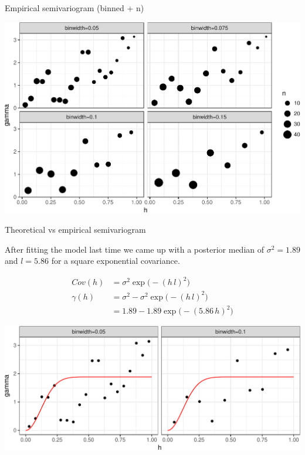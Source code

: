 \documentclass[11pt,ignorenonframetext,]{beamer}
\begin{document}
\begin{frame}{%
\protect\hypertarget{empirical-semivariogram-binned-n}{%
Empirical semivariogram (binned + n)}}

\begin{center}\includegraphics[width=\textwidth]{Lec13_files/figure-beamer/unnamed-chunk-7-1} \end{center}

\end{frame}

\begin{frame}{%
\protect\hypertarget{theoretical-vs-empirical-semivariogram}{%
Theoretical vs empirical semivariogram}}

After fitting the model last time we came up with a posterior median of
\(\sigma^2 = 1.89\) and \(l=5.86\) for a square exponential covariance.

\pause

\scriptsize

\[ \begin{aligned}
Cov(h) &= \sigma^2 \exp\big(-(h\,l)^2\big) \\
\gamma(h) 
  &= \sigma^2 - \sigma^2 \exp\big(-(h\,l)^2\big) \\
  &= 1.89 - 1.89 \exp\big(-(5.86\, h)^2\big)
\end{aligned}\]

\pause

\begin{center}\includegraphics[width=\textwidth]{Lec13_files/figure-beamer/unnamed-chunk-8-1} \end{center}

\end{frame}
\end{document}
